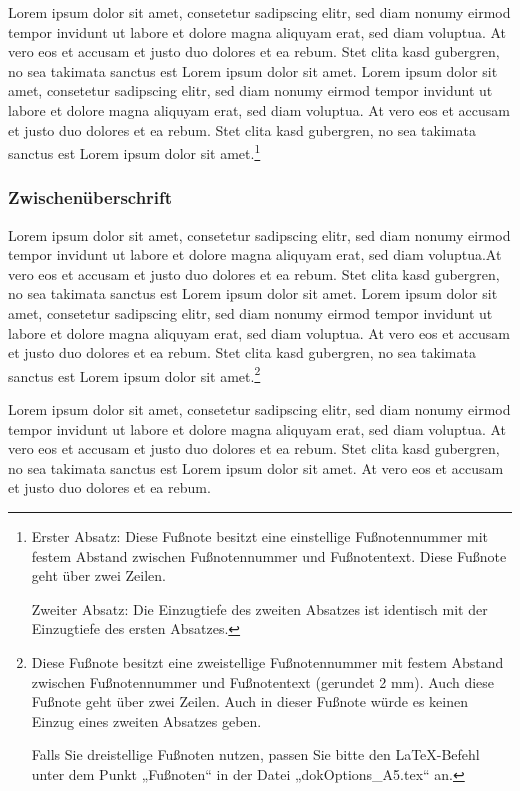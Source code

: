 Lorem ipsum dolor sit amet, consetetur sadipscing elitr, sed diam nonumy eirmod tempor invidunt ut labore et dolore magna aliquyam erat, sed diam voluptua. At vero eos et accusam et justo duo dolores et ea rebum. Stet clita kasd gubergren, no sea takimata sanctus est Lorem ipsum dolor sit amet. Lorem ipsum dolor sit amet, consetetur sadipscing elitr, sed diam nonumy eirmod tempor invidunt ut labore et dolore magna aliquyam erat, sed diam voluptua. At vero eos et accusam et justo duo dolores et ea rebum. Stet clita kasd gubergren, no sea takimata sanctus est Lorem ipsum dolor sit amet.\footnote{%
	Erster Absatz: Diese Fußnote besitzt eine einstellige Fußnotennummer mit festem Abstand zwischen Fußnotennummer und Fußnotentext. Diese Fußnote geht über zwei Zeilen.
	
	Zweiter Absatz: Die Einzugtiefe des zweiten Absatzes ist identisch mit der Einzugtiefe des ersten Absatzes.} %

\subsubsection*{Zwischenüberschrift}
\label{sssec:Zwischenüberschrift}
Lorem ipsum dolor sit amet, consetetur sadipscing elitr, sed diam nonumy eirmod tempor invidunt ut labore et dolore magna aliquyam erat, sed diam voluptua.At vero eos et accusam et justo duo dolores et ea rebum. Stet clita kasd gubergren, no sea takimata sanctus est Lorem ipsum dolor sit amet. Lorem ipsum dolor sit amet, consetetur sadipscing elitr, sed diam nonumy eirmod tempor invidunt ut labore et dolore magna aliquyam erat, sed diam voluptua. At vero eos et accusam et justo duo dolores et ea rebum. Stet clita kasd gubergren, no sea takimata sanctus est Lorem ipsum dolor sit amet.\footnote[13]{%
	Diese Fußnote besitzt eine zweistellige Fußnotennummer mit festem Abstand zwischen Fußnotennummer und Fußnotentext (gerundet 2 mm). Auch diese Fußnote geht über zwei Zeilen. Auch in dieser Fußnote würde es keinen Einzug eines zweiten Absatzes geben. 
	
	Falls Sie dreistellige Fußnoten nutzen, passen Sie bitte den LaTeX-Befehl unter dem Punkt „Fußnoten“ in der Datei „dokOptions\_A5.tex“ an.}%

Lorem ipsum dolor sit amet, consetetur sadipscing elitr, sed diam nonumy eirmod tempor invidunt ut labore et dolore magna aliquyam erat, sed diam voluptua. At vero eos et accusam et justo duo dolores et ea rebum. Stet clita kasd gubergren, no sea takimata sanctus est Lorem ipsum dolor sit amet. At vero eos et accusam et justo duo dolores et ea rebum.

